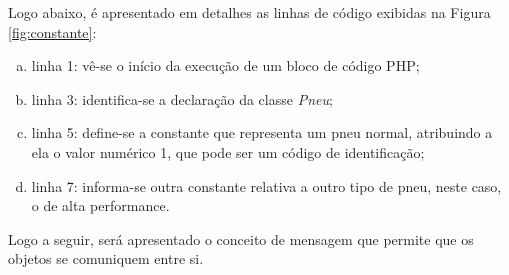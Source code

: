 \FloatBarrier 	%

Logo abaixo, é apresentado em detalhes as linhas de código exibidas na Figura 
\ref{fig:constante}:

\begin{enumerate}[a)]
    \item linha 1: vê-se o início da execução de um bloco de código PHP;
    \item linha 3: identifica-se a declaração da classe \textit{Pneu};
    \item linha 5: define-se a constante que representa um pneu normal,
    atribuindo a ela o valor numérico 1, que pode ser um código de
    identificação;
    \item linha 7: informa-se outra constante relativa a outro tipo de pneu,
    neste caso, o de alta performance.
\end{enumerate}

Logo a seguir, será apresentado o conceito de mensagem que permite que os
objetos se comuniquem entre si.
